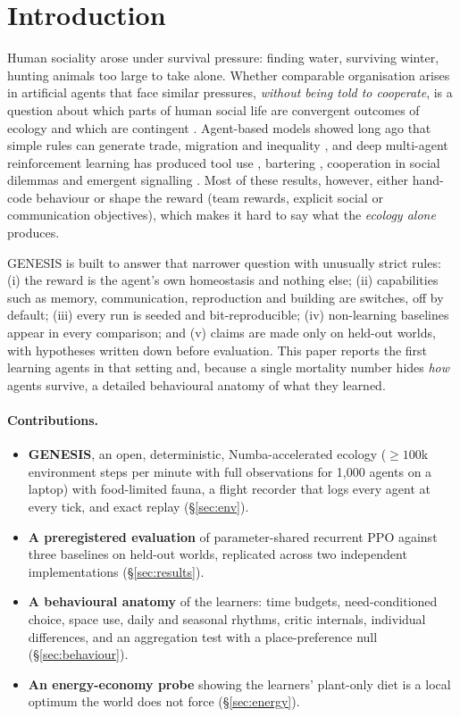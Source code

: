 \documentclass[10pt]{article}
\begin{document}
\section{Introduction}
Human sociality arose under survival pressure: finding water, surviving winter, hunting animals too large to take
alone. Whether comparable organisation arises in artificial agents that face similar pressures, \emph{without being
told to cooperate}, is a question about which parts of human social life are convergent outcomes of ecology and which
are contingent \citep{duenez2023social}. Agent-based models showed long ago that simple rules can generate trade,
migration and inequality \citep{epstein1996growing}, and deep multi-agent reinforcement learning has produced tool use
\citep{baker2020emergent}, bartering \citep{johanson2022bartering}, cooperation in social dilemmas
\citep{leibo2017multi, perolat2017common, leibo2021meltingpot} and emergent signalling
\citep{foerster2016learning, lazaridou2017multi}. Most of these results, however, either hand-code behaviour or shape
the reward (team rewards, explicit social or communication objectives), which makes it hard to say what the
\emph{ecology alone} produces.

GENESIS is built to answer that narrower question with unusually strict rules: (i) the reward is the agent's own
homeostasis \citep{keramati2014homeostatic} and nothing else; (ii) capabilities such as memory, communication,
reproduction and building are switches, off by default; (iii) every run is seeded and bit-reproducible; (iv)
non-learning baselines appear in every comparison; and (v) claims are made only on held-out worlds, with hypotheses
written down before evaluation. This paper reports the first learning agents in that setting and, because a single
mortality number hides \emph{how} agents survive, a detailed behavioural anatomy of what they learned.

\paragraph{Contributions.}
\begin{itemize}
  \item \textbf{GENESIS}, an open, deterministic, Numba-accelerated ecology (${\geq}100$k environment steps per
  minute with full observations for 1{,}000 agents on a laptop) with food-limited fauna, a flight recorder that
  logs every agent at every tick, and exact replay (\S\ref{sec:env}).
  \item \textbf{A preregistered evaluation} of parameter-shared recurrent PPO against three baselines on held-out
  worlds, replicated across two independent implementations (\S\ref{sec:results}).
  \item \textbf{A behavioural anatomy} of the learners: time budgets, need-conditioned choice, space use, daily and
  seasonal rhythms, critic internals, individual differences, and an aggregation test with a place-preference null
  (\S\ref{sec:behaviour}).
  \item \textbf{An energy-economy probe} showing the learners' plant-only diet is a local optimum the world does not
  force (\S\ref{sec:energy}).
\end{itemize}
\end{document}
